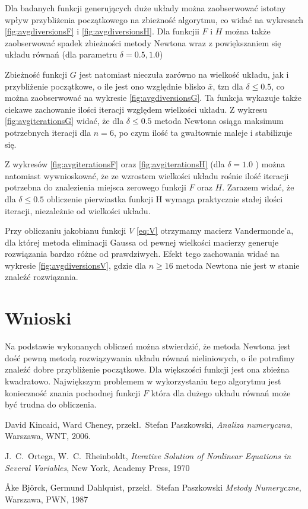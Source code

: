 \documentclass[11pt,wide]{mwart}
\begin{document}
Dla badanych funkcji generujących duże układy można zaobserwować istotny wpływ przybliżenia początkowego na zbieżność algorytmu, co widać na wykresach \ref{fig:avgdiversionsF} i \ref{fig:avgdiversionsH}. Dla funkcjii $ F $ i $ H $ można także zaobserwować spadek zbieżności metody Newtona wraz z powiększaniem się układu równań (dla parametru $ \delta = 0.5, 1.0 $)

Zbieżność funkcji $ G $ jest natomiast nieczuła zarówno na wielkość układu, jak i przybliżenie początkowe, o ile jest ono względnie blisko $ \bar{x} $, tzn dla $ \delta \leq 0.5 $, co można zaobserwować na wykresie \ref{fig:avgdiversionsG}. Ta funkcja wykazuje także ciekawe zachowanie ilości iteracji względem wielkości układu. Z wykresu \ref{fig:avgiterationsG} widać, że dla $ \delta \leq 0.5 $ metoda Newtona osiąga maksimum potrzebnych iteracji dla $ n = 6 $, po czym ilość ta gwałtownie maleje i stabilizuje się.

Z wykresów \ref{fig:avgiterationsF} oraz \ref{fig:avgiterationsH} (dla $ \delta = 1.0 $ )  można natomiast wywnioskować, że ze wzrostem wielkości układu rośnie ilość iteracji potrzebna do znalezienia miejsca zerowego funkcji $ F $ oraz $ H $. Zarazem widać, że dla $ \delta \leq 0.5 $ obliczenie pierwiastka funkcji H wymaga praktycznie stałej ilości iteracji, niezależnie od wielkości układu.

Przy obliczaniu jakobianu funkcji $ V $ \eqref{eq:V} otrzymamy macierz Vandermonde'a, dla której metoda eliminacji Gaussa od pewnej wielkości macierzy generuje rozwiązania bardzo różne od prawdziwych. Efekt tego zachowania widać na wykresie \ref{fig:avgdiversionsV}, gdzie dla $ n \geq 16 $ metoda Newtona nie jest w stanie znaleźć rozwiązania. 

\section{Wnioski}

Na podstawie wykonanych obliczeń można stwierdzić, że metoda Newtona jest dość pewną metodą rozwiązywania układu równań nieliniowych, o ile potrafimy znaleźć dobre przybliżenie początkowe. Dla większości funkcji jest ona zbieżna kwadratowo. Największym problemem w wykorzystaniu tego algorytmu jest konieczność znania pochodnej funkcji $ F $ która dla dużego układu równań może być trudna do obliczenia. 

\begin{thebibliography}{99}

 David Kincaid, Ward Cheney, przekł.~Stefan Paszkowski,
\emph{Analiza numeryczna},
Warszawa, WNT, 2006.

 J.~C.~Ortega, W.~C.~Rheinboldt,
\emph{Iterative Solution of Nonlinear Equations in Several Variables},
New York, Academy Press, 1970

 \r{A}ke Bj\"{o}rck, Germund Dahlquist, przekł.~Stefan Paszkowski
\emph{Metody Numeryczne},
Warszawa, PWN, 1987

\end{thebibliography}
\end{document}
